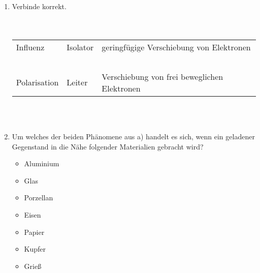 \documentclass[task=1]{exercise}
\begin{document}
  \task[Ph\"anomene]
  \begin{enumerate}[label=\textnormal{\alph*)}]
    \item Verbinde korrekt.\\~\\~\\
    \begin{tabular}{p{}p{}l}
      Influenz    & Isolator  & geringfügige Verschiebung von Elektronen\\~\\
      Polarisation& Leiter    & Verschiebung von frei beweglichen Elektronen\\
    \end{tabular}~\\~\\
    \item Um welches der beiden Phänomene aus a) handelt es sich, wenn ein geladener Gegenstand in die Nähe folgender Materialien gebracht wird?\\
    \begin{itemize}
     \item Aluminium
     \item Glas
     \item Porzellan
     \item Eisen
     \item Papier
     \item Kupfer
     \item Grieß
    \end{itemize}

  \end{enumerate}
  
\end{document}
